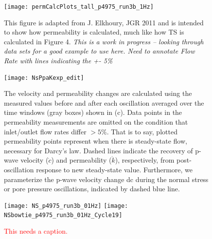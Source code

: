 \documentclass[letterpaper,10pt]{article}
\begin{document}
\newpage

\begin{figure}[ht]
	\centering
	\texttt{[image: permCalcPlots\_tall\_p4975\_run3b\_1Hz]}
	\caption[]{This figure is adapted from J. Elkhoury, JGR 2011 and is intended to show how permeability is calculated, much like how TS is calculated in Figure 4. \textit{This is a work in progress – looking through data sets for a good example to use here. Need to annotate Flow Rate with lines indicating the +- 5\%}}
	\label{fig:exp_over}
\end{figure}

\newpage

\begin{figure}[ht]
	\centering
	\texttt{[image: NsPpaKexp\_edit]}
	\caption[]{The velocity and permeability changes are calculated using the measured values before and after each oscillation averaged over the time windows (gray boxes) shown in (c). Data points in the permeability measurements are omitted on the condition that inlet/outlet flow rates differ $ > 5 \% $. That is to say, plotted permeability points represent when there is steady-state flow, necessary for Darcy’s law. Dashed lines indicate the recovery of p-wave velocity ($ \dot c$) and permeability ($\dot k$), respectively, from post-oscillation response to new steady-state value. Furthermore, we parameterize the p-wave velocity change dc during the normal stress or pore pressure oscillations, indicated by dashed blue line.}
	\label{fig:delc_delk_calc}
\end{figure}

\newpage

\begin{figure}[ht]
	\centering
	\texttt{[image: NS\_p4975\_run3b\_01Hz]}
	\texttt{[image: NSbowtie\_p4975\_run3b\_01Hz\_Cycle19]}
	\caption[]{\textcolor{red}{This needs a caption.}}
	\label{fig:NS_p4975_run3b_01Hz}
\end{figure}

\newpage



\end{document}
